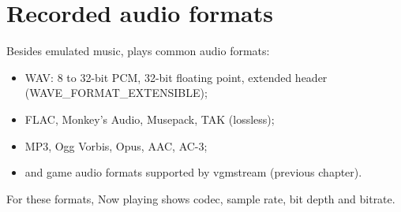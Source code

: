 \chapter{Recorded audio formats}
Besides emulated music, \soft plays common audio formats:
\begin{itemize}
  \item WAV: 8 to 32-bit PCM, 32-bit floating point, extended header (WAVE\_FORMAT\_EXTENSIBLE);
  \item FLAC, Monkey's Audio, Musepack, TAK (lossless);
  \item MP3, Ogg Vorbis, Opus, AAC, AC-3;
  \item and game audio formats supported by vgmstream (previous chapter).
\end{itemize}
For these formats, Now playing shows codec, sample rate, bit depth and bitrate.
